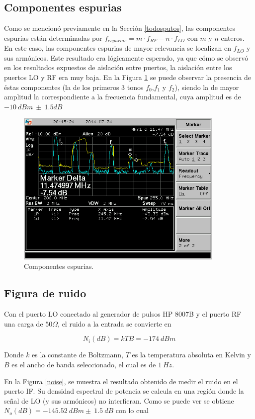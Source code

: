 \documentclass[a4paper,10pt]{article}
\begin{document}
	\subsection{Componentes espurias}
	Como se mencion\'o previamente en la Secci\'on \ref{todosputos}, las componentes espurias est\'an determinadas por $f_{espurias}=m\cdot f_{RF}-n\cdot f_{LO}$ con $m$ y $n$ enteros. En este caso, las componentes espurias de mayor relevancia se localizan en $f_{LO}$ y sus arm\'onicos. Este resultado era l\'ogicamente esperado, ya que c\'omo se observ\'o en los resultados expuestos de aislaci\'on entre puertos, la aislaci\'on entre los puertos LO y RF era muy baja.
	En la Figura \ref{espurios} se puede observar la presencia de \'estas componentes (la de los primeros 3 tonos $f_0$,$f_1$ y $f_2$), siendo la de mayor amplitud la correspondiente a la frecuencia fundamental, cuya amplitud es de $-10~dBm~\pm~1.5dB$
	
	\begin{figure}[!htb]
		\centering
		\includegraphics[width=10cm]{Images/SCREN539.png}
		\caption{Componentes espurias.}
		\label{espurios}
	\end{figure}
		
	\subsection{Figura de ruido}
		Con el puerto LO conectado al generador de pulsos HP 8007B y el puerto RF una carga de $50\Omega$, el ruido a la entrada se convierte en 

		$$N_i(dB)=kTB=-174~dBm$$
		
		Donde $k$ es la constante de Boltzmann, $T$ es la temperatura 
		absoluta en Kelvin y $B$ es el ancho de banda seleccionado, el cual es de $1~Hz$.

		En la Figura \ref{noise}, se muestra el resultado obtenido de 
		medir el ruido en el puerto IF. Su densidad espectral de potencia se calcula en una regi\'on donde la se\~nal de LO (y sus arm\'onicos) no interfieran. Como se puede ver se obtiene 
		$N_o(dB)=-145.52~dBm\pm~1.5~dB$ con lo cual
		
\end{document}
